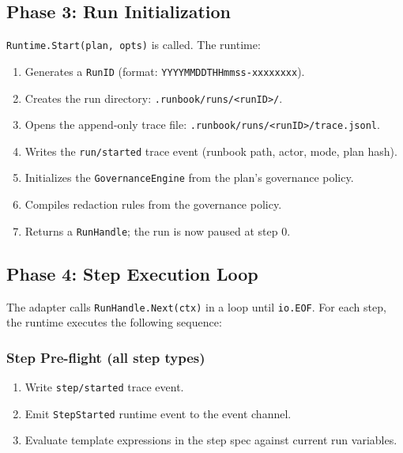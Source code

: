 \subsection{Phase 3: Run Initialization}

\texttt{Runtime.Start(plan, opts)} is called. The runtime:
\begin{enumerate}
  \item Generates a \texttt{RunID} (format: \texttt{YYYYMMDDTHHmmss-xxxxxxxx}).
  \item Creates the run directory: \texttt{.runbook/runs/<runID>/}.
  \item Opens the append-only trace file: \texttt{.runbook/runs/<runID>/trace.jsonl}.
  \item Writes the \texttt{run/started} trace event (runbook path, actor, mode, plan hash).
  \item Initializes the \texttt{GovernanceEngine} from the plan's governance policy.
  \item Compiles redaction rules from the governance policy.
  \item Returns a \texttt{RunHandle}; the run is now paused at step 0.
\end{enumerate}

\subsection{Phase 4: Step Execution Loop}

The adapter calls \texttt{RunHandle.Next(ctx)} in a loop until \texttt{io.EOF}.
For each step, the runtime executes the following sequence:

\subsubsection*{Step Pre-flight (all step types)}
\begin{enumerate}
  \item Write \texttt{step/started} trace event.
  \item Emit \texttt{StepStarted} runtime event to the event channel.
  \item Evaluate template expressions in the step spec against current run variables.
\end{enumerate}

